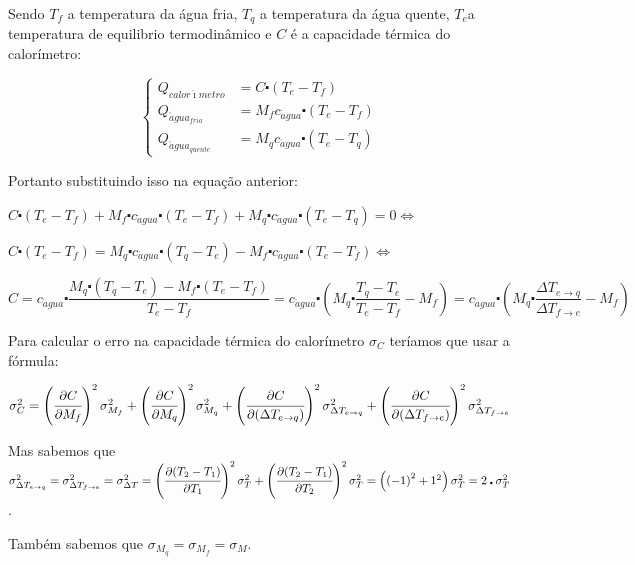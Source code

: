 \documentclass[a4paper]{article}
\begin{document}
			Sendo $T_{f}$ a temperatura da água fria, $T_{q}$ a temperatura da água quente, $T_{e}$a temperatura de equilibrio termodinâmico e $C$ é a capacidade térmica do calorímetro:

			\[
			\begin{cases}
				Q_{calor\acute{\imath}metro} & =C\centerdot(T_{e}-T_{f})\\
				Q_{\acute{a}gua_{fria}} & =M_{f}c_{\acute{a}gua}\centerdot(T_{e}-T_{f})\\
				Q_{\acute{a}gua_{quente}} & =M_{q}c_{\acute{a}gua}\centerdot(T_{e}-T_{q})
			\end{cases}
			\]


			Portanto substituindo isso na equação anterior:

			$C\centerdot(T_{e}-T_{f})+M_{f}\centerdot c_{\acute{a}gua}\centerdot(T_{e}-T_{f})+M_{q}\centerdot c_{\acute{a}gua}\centerdot(T_{e}-T_{q})=0\Longleftrightarrow$

			$C\centerdot(T_{e}-T_{f})=M_{q}\centerdot c_{\acute{a}gua}\centerdot(T_{q}-T_{e})-M_{f}\centerdot c_{\acute{a}gua}\centerdot(T_{e}-T_{f})\Longleftrightarrow$

			$C=c_{\acute{a}gua}\centerdot\dfrac{M_{q}\centerdot(T_{q}-T_{e})-M_{f}\centerdot(T_{e}-T_{f})}{T_{e}-T_{f}}=c_{\acute{a}gua}\centerdot\left(M_{q}\centerdot\dfrac{T_{q}-T_{e}}{T_{e}-T_{f}}-M_{f}\right)=c_{\acute{a}gua}\centerdot\left(M_{q}\centerdot\dfrac{\Delta T_{e\rightarrow q}}{\Delta T_{f\rightarrow e}}-M_{f}\right)$

			Para calcular o erro na capacidade térmica do calorímetro $\sigma_{C}$
			teríamos que usar a fórmula:

			$\sigma_{C}^{2}=\left(\cfrac{\partial C}{\partial M_{f}}\right)^{2}\sigma_{M_{f}}^{2}+\left(\cfrac{\partial C}{\partial M_{q}}\right)^{2}\sigma_{M_{q}}^{2}+\left(\cfrac{\partial C}{\partial(\Delta T_{e\rightarrow q})}\right)^{2}\sigma_{\Delta T_{e\rightarrow q}}^{2}+\left(\cfrac{\partial C}{\partial(\Delta T_{f\rightarrow e})}\right)^{2}\sigma_{\Delta T_{f\rightarrow e}}^{2}$

			Mas sabemos que $\sigma_{\Delta T_{e\rightarrow q}}^{2}=\sigma_{\Delta T_{f\rightarrow e}}^{2}=\sigma_{\Delta T}^{2}=\left(\cfrac{\partial(T_{2}-T_{1})}{\partial T_{1}}\right)^{2}\sigma_{T}^{2}+\left(\cfrac{\partial(T_{2}-T_{1})}{\partial T_{2}}\right)^{2}\sigma_{T}^{2}=\left(\left(-1\right)^{2}+1^{2}\right)\sigma_{T}^{2}=2\centerdot\sigma_{T}^{2}$.

			Também sabemos que $\sigma_{M_{q}}=\sigma_{M_{f}}=\sigma_{M}$.
\end{document}
